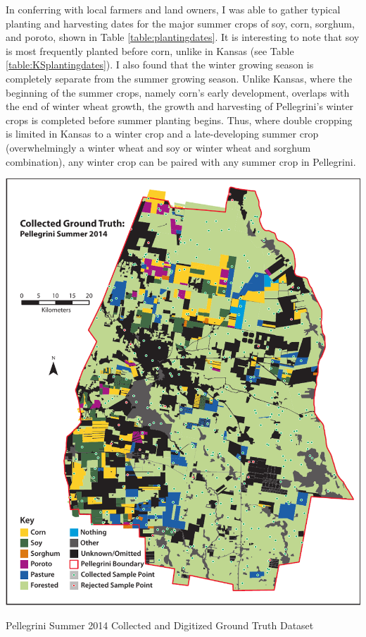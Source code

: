 In conferring with local farmers and land owners, I was able to gather typical planting and harvesting dates for the major summer crops of soy, corn, sorghum, and poroto, shown in Table \ref{table:plantingdates}. It is interesting to note that soy is most frequently planted before corn, unlike in Kansas (see Table \ref{table:KSplantingdates}). I also found that the winter growing season is completely separate from the summer growing season. Unlike Kansas, where the beginning of the summer crops, namely corn's early development, overlaps with the end of winter wheat growth, the growth and harvesting of Pellegrini's winter crops is completed before summer planting begins. Thus, where double cropping is limited in Kansas to a winter crop and a late-developing summer crop (overwhelmingly a winter wheat and soy or winter wheat and sorghum combination), any winter crop can be paired with any summer crop in Pellegrini.

\begin{ssfigure}
  \centering
  \includegraphics[width=\textwidth]{Graphics/collecteddata.pdf}
  \caption{Pellegrini Summer 2014 Collected and Digitized Ground Truth Dataset}
  \label{map:pellegrini:groundtruth}
\end{ssfigure}

